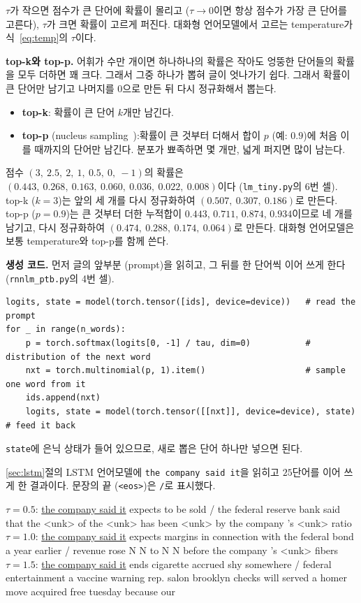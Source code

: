 \documentclass[11pt,a4paper]{article}
\newcommand{\eqnref}[1]{식~\eqref{eq:#1}}
\newcommand{\w}[1]{\texttt{#1}}
\begin{document}
$\tau$가 작으면 점수가 큰 단어에 확률이 몰리고 ($\tau\to0$이면 항상 점수가 가장 큰 단어를 고른다), $\tau$가 크면 확률이 고르게 퍼진다.
대화형 언어모델에서 고르는 temperature가 \eqnref{temp}의 $\tau$이다.

\textbf{top-k와 top-p.} 어휘가 수만 개이면 하나하나의 확률은 작아도 엉뚱한 단어들의 확률을 모두 더하면 꽤 크다. 그래서 그중 하나가 뽑혀 글이 엇나가기 쉽다.
그래서 확률이 큰 단어만 남기고 나머지를 $0$으로 만든 뒤 다시 정규화해서 뽑는다.
\begin{itemize}[leftmargin=1.5em]
\item \textbf{top-k}: 확률이 큰 단어 $k$개만 남긴다.
\item \textbf{top-p} (nucleus sampling~\cite{holtzman2020}):확률이 큰 것부터 더해서 합이 $p$ (예: $0.9$)에 처음 이를 때까지의 단어만 남긴다. 분포가 뾰족하면 몇 개만, 넓게 퍼지면 많이 남는다.
\end{itemize}
점수 $(3,\ 2.5,\ 2,\ 1,\ 0.5,\ 0,\ -1)$의 확률은 $(0.443,\ 0.268,\ 0.163,\ 0.060,\ 0.036,\ 0.022,\ 0.008)$이다 (\texttt{lm\_tiny.py}의 6번 셀).
top-k ($k=3$)는 앞의 세 개를 다시 정규화하여 $(0.507,\ 0.307,\ 0.186)$로 만든다.
top-p ($p=0.9$)는 큰 것부터 더한 누적합이 $0.443$, $0.711$, $0.874$, $0.934$이므로 네 개를 남기고,
다시 정규화하여 $(0.474,\ 0.288,\ 0.174,\ 0.064)$로 만든다.
대화형 언어모델은 보통 temperature와 top-p를 함께 쓴다.

\textbf{생성 코드.} 먼저 글의 앞부분 (prompt)을 읽히고, 그 뒤를 한 단어씩 이어 쓰게 한다 (\texttt{rnnlm\_ptb.py}의 4번 셀).

\begin{lstlisting}
logits, state = model(torch.tensor([ids], device=device))   # read the prompt
for _ in range(n_words):
    p = torch.softmax(logits[0, -1] / tau, dim=0)           # distribution of the next word
    nxt = torch.multinomial(p, 1).item()                    # sample one word from it
    ids.append(nxt)
    logits, state = model(torch.tensor([[nxt]], device=device), state)   # feed it back
\end{lstlisting}

\texttt{state}에 은닉 상태가 들어 있으므로, 새로 뽑은 단어 하나만 넣으면 된다.

\ref{sec:lstm}절의 LSTM 언어모델에 \w{the company said it}을 읽히고 $25$단어를 이어 쓰게 한 결과이다. 문장의 끝 (\w{<eos>})은 \w{/}로 표시했다.

\begin{remarkbox}
\ttfamily\small\raggedright
\textrm{$\tau=0.5$:} \underline{the company said it} expects to be sold / the federal reserve bank said that the <unk> of the <unk> has been <unk> by the company 's <unk> ratio\\[0.4em]
\textrm{$\tau=1.0$:} \underline{the company said it} expects margins in connection with the federal bond a year earlier / revenue rose N N to N N before the company 's <unk> fibers\\[0.4em]
\textrm{$\tau=1.5$:} \underline{the company said it} ends cigarette accrued shy somewhere / federal entertainment a vaccine warning rep. salon brooklyn checks will served a homer move acquired free tuesday because our
\end{remarkbox}
\end{document}

